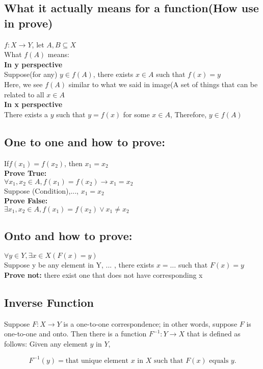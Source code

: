 \documentclass[a4paper]{article}
\begin{document}
\subsection{What it actually means for a function(How use in prove)}
$f: X \rightarrow Y$, let $A, B \subseteq X$\\
What $f(A)$ means:\\
\textbf{In y perspective}\\
Suppose(for any) $y \in f(A)$, there exists $x \in A$ such that $f(x) = y$\\
Here, we see $f(A)$ similar to what we said in image(A set of things that can be related to all $x \in A$\\
\textbf{In x perspective}\\
There exists a $y$ such that $y = f(x)$ for some $x \in A$, Therefore, $y \in f(A)$
\subsection{One to one and how to prove:}
If$f(x_1) = f(x_2)$, then $x_1 = x_2$\\
\textbf{Prove True:}\\
$\forall x_1, x_2 \in A, f(x_1) = f(x_2) \rightarrow x_1 = x_2$\\
Suppose (Condition),..., $x_1 = x_2$\\
\textbf{Prove False:}\\
$\exists x_1, x_2 \in A, f(x_1) = f(x_2) \vee x_1 \neq x_2$\\
\subsection{Onto and how to prove:}
$\forall y \in Y, \exists x \in X (F(x) = y)$\\
Suppose y be any element in Y, ... , there exists $x = \ldots$ such that $F(x) = y$ \\
\textbf{Prove not:} there exist one that does not have corresponding x\\
\subsection{Inverse Function}
Suppose \( F: X \rightarrow Y \) is a one-to-one correspondence; in other words, suppose \( F \) is one-to-one and onto. Then there is a function \( F^{-1}: Y \rightarrow X \) that is defined as follows: Given any element \( y \) in \( Y \),

\[ F^{-1}(y) = \text{that unique element } x \text{ in } X \text{ such that } F(x) \text{ equals } y. \]
\end{document}
